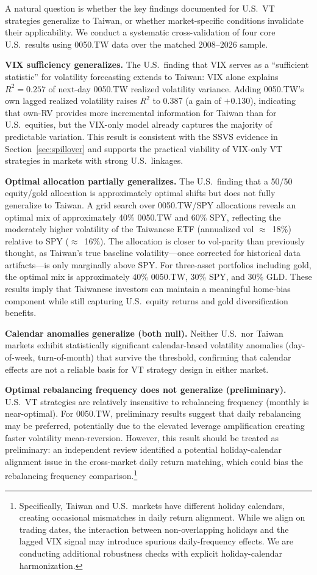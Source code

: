 A natural question is whether the key findings documented for U.S.\ VT strategies generalize to Taiwan, or whether market-specific conditions invalidate their applicability. We conduct a systematic cross-validation of four core U.S.\ results using 0050.TW data over the matched 2008--2026 sample.

\textbf{VIX sufficiency generalizes.} The U.S.\ finding that VIX serves as a ``sufficient statistic'' for volatility forecasting extends to Taiwan: VIX alone explains $R^2 = 0.257$ of next-day 0050.TW realized volatility variance. Adding 0050.TW's own lagged realized volatility raises $R^2$ to 0.387 (a gain of $+0.130$), indicating that own-RV provides more incremental information for Taiwan than for U.S.\ equities, but the VIX-only model already captures the majority of predictable variation. This result is consistent with the SSVS evidence in Section~\ref{sec:spillover} and supports the practical viability of VIX-only VT strategies in markets with strong U.S.\ linkages.

\textbf{Optimal allocation partially generalizes.} The U.S.\ finding that a 50/50 equity/gold allocation is approximately optimal shifts but does not fully generalize to Taiwan. A grid search over 0050.TW/SPY allocations reveals an optimal mix of approximately 40\% 0050.TW and 60\% SPY, reflecting the moderately higher volatility of the Taiwanese ETF (annualized vol $\approx$~18\%) relative to SPY ($\approx$~16\%). The allocation is closer to vol-parity than previously thought, as Taiwan's true baseline volatility---once corrected for historical data artifacts---is only marginally above SPY. For three-asset portfolios including gold, the optimal mix is approximately 40\% 0050.TW, 30\% SPY, and 30\% GLD. These results imply that Taiwanese investors can maintain a meaningful home-bias component while still capturing U.S.\ equity returns and gold diversification benefits.

\textbf{Calendar anomalies generalize (both null).} Neither U.S.\ nor Taiwan markets exhibit statistically significant calendar-based volatility anomalies (day-of-week, turn-of-month) that survive the \citet{harvey2016} threshold, confirming that calendar effects are not a reliable basis for VT strategy design in either market.

\textbf{Optimal rebalancing frequency does not generalize (preliminary).} U.S.\ VT strategies are relatively insensitive to rebalancing frequency (monthly is near-optimal). For 0050.TW, preliminary results suggest that daily rebalancing may be preferred, potentially due to the elevated leverage amplification creating faster volatility mean-reversion. However, this result should be treated as preliminary: an independent review identified a potential holiday-calendar alignment issue in the cross-market daily return matching, which could bias the rebalancing frequency comparison.\footnote{Specifically, Taiwan and U.S.\ markets have different holiday calendars, creating occasional mismatches in daily return alignment. While we align on trading dates, the interaction between non-overlapping holidays and the lagged VIX signal may introduce spurious daily-frequency effects. We are conducting additional robustness checks with explicit holiday-calendar harmonization.}


